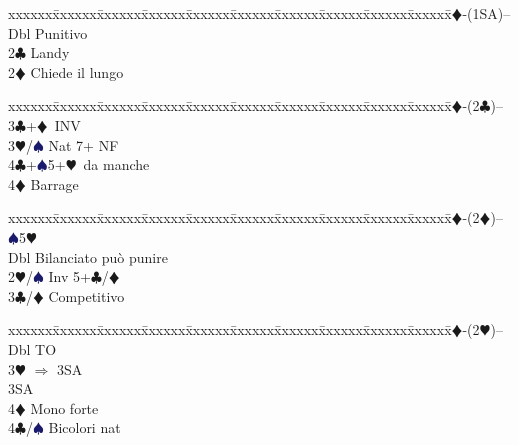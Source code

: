 \documentclass[a4paper,italian]{article}
\newcommand{\BC}{\textcolor{OliveGreen}{$\clubsuit$}}
\newcommand{\BD}{\textcolor{RedOrange}{$\vardiamondsuit$}}
\newcommand{\BH}{\textcolor{Red2}{$\varheartsuit${}}}
\newcommand{\BS}{\textcolor{MidnightBlue}{$\spadesuit${}}}
\newenvironment{bidtable}
{\begin{tabbing}

    xxxxxx\=xxxxxx\=xxxxxx\=xxxxxx\=xxxxxx\=xxxxxx\=xxxxxx\=xxxxxx\=xxxxxx\=xxxxxx\=\kill}
{\end{tabbing} }%
\begin{document}
                                    \begin{multicols}{2}
                                        \begin{bidtable}
                                            1\BD-(1SA)--\+\\
                                            Dbl \> Punitivo\\
                                            2\BC \> Landy\+\\
                                            2\BD \> Chiede il lungo\-\-
                                        \end{bidtable}
                                        \begin{bidtable}
                                            1\BD-(2\BC)--\+\\
                                            3\BC {}+\BD\ INV\\
                                            3\BH/\BS \> Nat 7+ NF\\
                                            4\BC {}+\BS 5+\BH\ da manche\\
                                            4\BD \> Barrage\-
                                        \end{bidtable}
                                        \begin{bidtable}
                                            1\BD-(2\BD)-- \> \BS 5\BH \+\\
                                            Dbl \> Bilanciato può punire\\
                                            2\BH/\BS \> Inv 5+\BC /\BD \\
                                            3\BC/\BD \> Competitivo\-
                                        \end{bidtable}
                                        \begin{bidtable}
                                            1\BD-(2\BH)--\+\\
                                            Dbl \> TO\+\\
                                            3\BH\> $\Rightarrow$ 3SA\+\\
                                            3SA\+\\
                                            4\BD\> Mono forte\\
                                            4\BC/\BS\> Bicolori nat \-\-\\

\end{bidtable}
\end{multicols}
\end{document}
